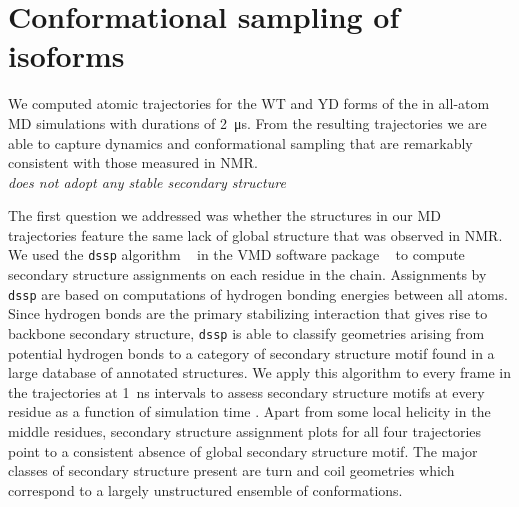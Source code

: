 \section{Conformational sampling of \gct isoforms}

We computed atomic trajectories for the WT and YD forms of the \gct in all-atom MD simulations with durations of \SI{2}{\us}. From the resulting trajectories we are able to capture dynamics and conformational sampling that are remarkably consistent with those measured in NMR.\\


{\it \gct does not adopt any stable secondary structure}

The first question we addressed was whether the structures in our MD trajectories feature the same lack of global structure that was observed in NMR. We used the \texttt{dssp} algorithm ~\cite{kabsch1983dictionary} in the VMD software package ~\cite{humphrey1996vmd} to compute secondary structure assignments on each residue in the chain. Assignments by \texttt{dssp} are based on computations of hydrogen bonding energies between all atoms. Since hydrogen bonds are the primary stabilizing interaction that gives rise to backbone secondary structure, \texttt{dssp} is able to classify geometries arising from potential hydrogen bonds to a category of secondary structure motif found in a large database of annotated structures. We apply this algorithm to every frame in the trajectories at \SI{1}{\ns} intervals to assess secondary structure motifs at every residue as a function of simulation time . Apart from some local helicity in the middle residues, secondary structure assignment plots for all four trajectories point to a consistent absence of global secondary structure motif. The major classes of secondary structure present are turn and coil geometries which correspond to a largely unstructured ensemble of conformations. 

\begin{figure}
	\centering     %
	\subfigure[WT]{\label{fig:ss_a}\texttt{[image: wt\_ss]}}
	\subfigure[YD]{\label{fig:ss_b}\texttt{[image: yd\_ss]}}
	\label{fig:ss}
\end{figure}	


